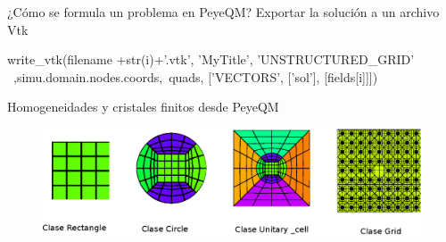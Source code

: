 \documentclass[xcolor=table,serif,handout]{beamer}
\begin{document}
	\begin{frame}[fragile]{¿Cómo se formula un problema en PeyeQM?}
	Exportar la solución a un archivo Vtk
	\begin{python}
	write_vtk(filename +str(i)+'.vtk', 'MyTitle', 'UNSTRUCTURED_GRID' \
	 ,simu.domain.nodes.coords,\	 				
        quads, ['VECTORS', ['sol'], [fields[i]]])
\end{python}
	\end{frame}
	\begin{frame}[fragile]{Homogeneidades y cristales finitos desde PeyeQM}
		\begin{figure}
		\centering
		\includegraphics[scale=0.7]{gmsh_library_classes.eps}
		\end{figure}
	\end{frame}
\end{document}
